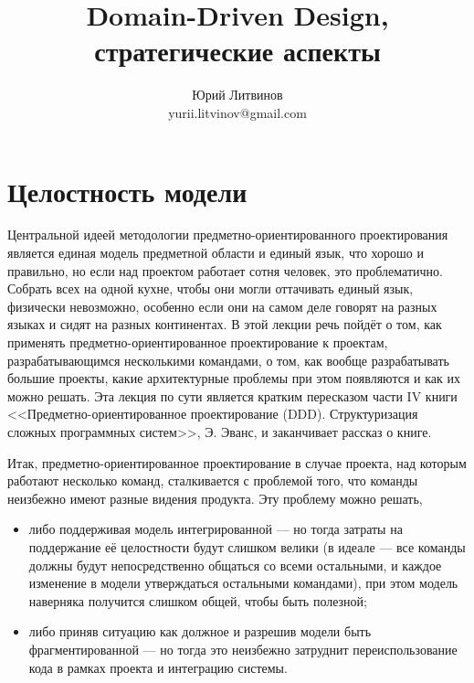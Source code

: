 \documentclass[a5paper]{article}
\title{Domain-Driven Design, стратегические аспекты}
\author{Юрий Литвинов\\\small{yurii.litvinov@gmail.com}}
\date{}
\begin{document}
\maketitle
\thispagestyle{empty}

\section{Целостность модели}

Центральной идеей методологии предметно-ориентированного проектирования является единая модель предметной области и единый язык, что хорошо и правильно, но если над проектом работает сотня человек, это проблематично. Собрать всех на одной кухне, чтобы они могли оттачивать единый язык, физически невозможно, особенно если они на самом деле говорят на разных языках и сидят на разных континентах. В этой лекции речь пойдёт о том, как применять предметно-ориентированное проектирование к проектам, разрабатывающимся несколькими командами, о том, как вообще разрабатывать большие проекты, какие архитектурные проблемы при этом появляются и как их можно решать. Эта лекция по сути является кратким пересказом части IV книги <<Предметно-ориентированное проектирование (DDD). Структуризация сложных программных систем>>, Э. Эванс, и заканчивает рассказ о книге.

Итак, предметно-ориентированное проектирование в случае проекта, над которым работают несколько команд, сталкивается с проблемой того, что команды неизбежно имеют разные видения продукта. Эту проблему можно решать, 

\begin{itemize}
    \item либо поддерживая модель интегрированной --- но тогда затраты на поддержание её целостности будут слишком велики (в идеале --- все команды должны будут непосредственно общаться со всеми остальными, и каждое изменение в модели утверждаться остальными командами), при этом модель наверняка получится слишком общей, чтобы быть полезной;
    \item либо приняв ситуацию как должное и разрешив модели быть фрагментированной --- но тогда это неизбежно затруднит переиспользование кода в рамках проекта и интеграцию системы.
\end{itemize}
\end{document}
